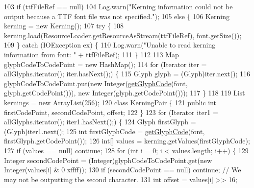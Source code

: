 \begin{DoxyCode}
103         \textcolor{keywordflow}{if} (ttfFileRef == null)
104             Log.warn(\textcolor{stringliteral}{"Kerning information could not be output because a TTF font file was not specified."});
105         \textcolor{keywordflow}{else} \{
106             Kerning kerning = \textcolor{keyword}{new} Kerning();
107             \textcolor{keywordflow}{try} \{
108                 kerning.load(ResourceLoader.getResourceAsStream(ttfFileRef), font.getSize());
109             \} \textcolor{keywordflow}{catch} (IOException ex) \{
110                 Log.warn(\textcolor{stringliteral}{"Unable to read kerning information from font: "} + ttfFileRef);
111             \}
112 
113             Map glyphCodeToCodePoint = \textcolor{keyword}{new} HashMap();
114             \textcolor{keywordflow}{for} (Iterator iter = allGlyphs.iterator(); iter.hasNext();) \{
115                 Glyph glyph = (Glyph)iter.next();
116                 glyphCodeToCodePoint.put(\textcolor{keyword}{new} Integer(\mbox{\hyperlink{classorg_1_1newdawn_1_1slick_1_1tools_1_1hiero_1_1_b_m_font_util_a698b237c62793730ef53730c52a5ae97}{getGlyphCode}}(font, glyph.getCodePoint())),
       \textcolor{keyword}{new} Integer(glyph.getCodePoint()));
117             \}
118 
119             List kernings = \textcolor{keyword}{new} ArrayList(256);
120             \textcolor{keyword}{class }KerningPair \{
121                 \textcolor{keyword}{public} \textcolor{keywordtype}{int} firstCodePoint, secondCodePoint, offset;
122             \}
123             \textcolor{keywordflow}{for} (Iterator iter1 = allGlyphs.iterator(); iter1.hasNext();) \{
124                 Glyph firstGlyph = (Glyph)iter1.next();
125                 \textcolor{keywordtype}{int} firstGlyphCode = \mbox{\hyperlink{classorg_1_1newdawn_1_1slick_1_1tools_1_1hiero_1_1_b_m_font_util_a698b237c62793730ef53730c52a5ae97}{getGlyphCode}}(font, firstGlyph.getCodePoint());
126                 \textcolor{keywordtype}{int}[] values = kerning.getValues(firstGlyphCode);
127                 \textcolor{keywordflow}{if} (values == null) \textcolor{keywordflow}{continue};
128                 \textcolor{keywordflow}{for} (\textcolor{keywordtype}{int} i = 0; i < values.length; i++) \{
129                     Integer secondCodePoint = (Integer)glyphCodeToCodePoint.get(\textcolor{keyword}{new} Integer(values[i] & 0
      xffff));
130                     \textcolor{keywordflow}{if} (secondCodePoint == null) \textcolor{keywordflow}{continue}; \textcolor{comment}{// We may not be outputting the second
       character.}
131                     \textcolor{keywordtype}{int} offset = values[i] >> 16;

\end{DoxyCode}
